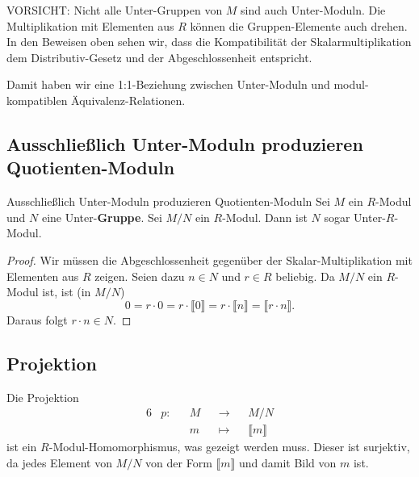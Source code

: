 \documentclass[a4paper]{amsart}
\theoremstyle{definition}
\begin{document}
VORSICHT: Nicht alle Unter-Gruppen von $M$ sind auch Unter-Moduln. Die Multiplikation mit Elementen aus $R$ können die Gruppen-Elemente auch drehen. In den Beweisen oben sehen wir, dass die Kompatibilität der Skalarmultiplikation dem Distributiv-Gesetz und der Abgeschlossenheit entspricht.

{\color{red}Damit haben wir eine 1:1-Beziehung zwischen Unter-Moduln und modul-kompatiblen Äquivalenz-Relationen.}

\subsection{Ausschließlich Unter-Moduln produzieren Quotienten-Moduln}
\begin{Satz}{Ausschließlich Unter-Moduln produzieren Quotienten-Moduln}
Sei $M$ ein $R$-Modul und $N$ eine Unter-\textbf{Gruppe}. Sei $M/N$ ein $R$-Modul. Dann ist $N$ sogar Unter-$R$-Modul.
\end{Satz}
\begin{proof}
   Wir müssen die Abgeschlossenheit gegenüber der Skalar-Multiplikation mit Elementen aus $R$ zeigen. Seien dazu $n \in N$ und $r \in R$ beliebig. Da $M/N$ ein $R$-Modul ist, ist (in $M/N$)
   \begin{equation}\label{UnterModul}
      0 = r \cdot 0 = r \cdot \llbracket 0 \rrbracket = r \cdot \llbracket n \rrbracket =  \llbracket r \cdot n \rrbracket.
   \end{equation}
   Daraus folgt $r \cdot n \in N$.
\end{proof}

\subsection{Projektion}
Die Projektion
\begin{alignat}{6}
   &p \colon &&M &&\to &&M/N\\
   &         &&m &&\mapsto &&\llbracket m \rrbracket
\end{alignat}
ist ein $R$-Modul-Homomorphismus, was gezeigt werden muss. Dieser ist surjektiv, da jedes Element von $M/N$ von der Form $\llbracket m \rrbracket$ und damit Bild von $m$ ist.
\end{document}
